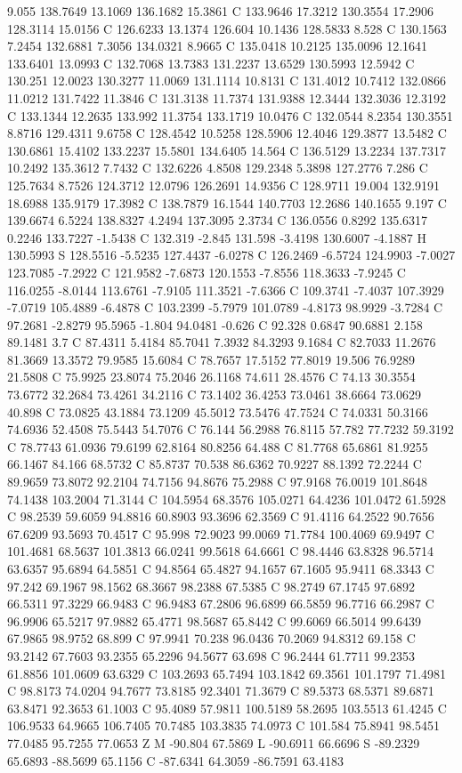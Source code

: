 {{{9.055 138.7649 13.1069 136.1682 15.3861 C 133.9646 17.3212 130.3554 17.2906 128.3114 15.0156 C 126.6233 13.1374 126.604 10.1436 128.5833 8.528 C 130.1563 7.2454 132.6881 7.3056 134.0321 8.9665 C 135.0418 10.2125 135.0096 12.1641 133.6401 13.0993 C 132.7068 13.7383 131.2237 13.6529 130.5993 12.5942 C 130.251 12.0023 130.3277 11.0069 131.1114 10.8131 C 131.4012 10.7412 132.0866 11.0212 131.7422 11.3846 C 131.3138 11.7374 131.9388 12.3444 132.3036 12.3192 C 133.1344 12.2635 133.992 11.3754 133.1719 10.0476 C 132.0544 8.2354 130.3551 8.8716 129.4311 9.6758 C 128.4542 10.5258 128.5906 12.4046 129.3877 13.5482 C 130.6861 15.4102 133.2237 15.5801 134.6405 14.564 C 136.5129 13.2234 137.7317 10.2492 135.3612 7.7432 C 132.6226 4.8508 129.2348 5.3898 127.2776 7.286 C 125.7634 8.7526 124.3712 12.0796 126.2691 14.9356 C 128.9711 19.004 132.9191 18.6988 135.9179 17.3982 C 138.7879 16.1544 140.7703 12.2686 140.1655 9.197 C 139.6674 6.5224 138.8327 4.2494 137.3095 2.3734 C 136.0556 0.8292 135.6317 0.2246 133.7227 -1.5438 C 132.319 -2.845 131.598 -3.4198 130.6007 -4.1887 H 130.5993 S 128.5516 -5.5235 127.4437 -6.0278 C 126.2469 -6.5724 124.9903 -7.0027 123.7085 -7.2922 C 121.9582 -7.6873 120.1553 -7.8556 118.3633 -7.9245 C 116.0255 -8.0144 113.6761 -7.9105 111.3521 -7.6366 C 109.3741 -7.4037 107.3929 -7.0719 105.4889 -6.4878 C 103.2399 -5.7979 101.0789 -4.8173 98.9929 -3.7284 C 97.2681 -2.8279 95.5965 -1.804 94.0481 -0.626 C 92.328 0.6847 90.6881 2.158 89.1481 3.7 C 87.4311 5.4184 85.7041 7.3932 84.3293 9.1684 C 82.7033 11.2676 81.3669 13.3572 79.9585 15.6084 C 78.7657 17.5152 77.8019 19.506 76.9289 21.5808 C 75.9925 23.8074 75.2046 26.1168 74.611 28.4576 C 74.13 30.3554 73.6772 32.2684 73.4261 34.2116 C 73.1402 36.4253 73.0461 38.6664 73.0629 40.898 C 73.0825 43.1884 73.1209 45.5012 73.5476 47.7524 C 74.0331 50.3166 74.6936 52.4508 75.5443 54.7076 C 76.144 56.2988 76.8115 57.782 77.7232 59.3192 C 78.7743 61.0936 79.6199 62.8164 80.8256 64.488 C 81.7768 65.6861 81.9255 66.1467 84.166 68.5732 C 85.8737 70.538 86.6362 70.9227 88.1392 72.2244 C 89.9659 73.8072 92.2104 74.7156 94.8676 75.2988 C 97.9168 76.0019 101.8648 74.1438 103.2004 71.3144 C 104.5954 68.3576 105.0271 64.4236 101.0472 61.5928 C 98.2539 59.6059 94.8816 60.8903 93.3696 62.3569 C 91.4116 64.2522 90.7656 67.6209 93.5693 70.4517 C 95.998 72.9023 99.0069 71.7784 100.4069 69.9497 C 101.4681 68.5637 101.3813 66.0241 99.5618 64.6661 C 98.4446 63.8328 96.5714 63.6357 95.6894 64.5851 C 94.8564 65.4827 94.1657 67.1605 95.9411 68.3343 C 97.242 69.1967 98.1562 68.3667 98.2388 67.5385 C 98.2749 67.1745 97.6892 66.5311 97.3229 66.9483 C 96.9483 67.2806 96.6899 66.5859 96.7716 66.2987 C 96.9906 65.5217 97.9882 65.4771 98.5687 65.8442 C 99.6069 66.5014 99.6439 67.9865 98.9752 68.899 C 97.9941 70.238 96.0436 70.2069 94.8312 69.158 C 93.2142 67.7603 93.2355 65.2296 94.5677 63.698 C 96.2444 61.7711 99.2353 61.8856 101.0609 63.6329 C 103.2693 65.7494 103.1842 69.3561 101.1797 71.4981 C 98.8173 74.0204 94.7677 73.8185 92.3401 71.3679 C 89.5373 68.5371 89.6871 63.8471 92.3653 61.1003 C 95.4089 57.9811 100.5189 58.2695 103.5513 61.4245 C 106.9533 64.9665 106.7405 70.7485 103.3835 74.0973 C 101.584 75.8941 98.5451 77.0485 95.7255 77.0653 Z M -90.804 67.5869 L -90.6911 66.6696 S -89.2329 65.6893 -88.5699 65.1156 C -87.6341 64.3059 -86.7591 63.4183 }}}
